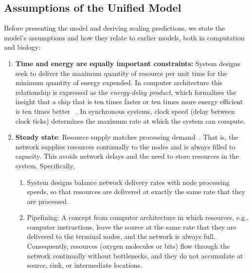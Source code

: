 \documentclass[12pt]{article}
\begin{document}
\subsection{Assumptions of the Unified Model}
\label{sec:assumptions}

Before presenting the model and deriving scaling predictions, we state the
model's assumptions and how they relate to earlier models, both in
computation and biology:

\begin{enumerate}
\item {\bf Time and energy are equally important constraints:} 
  System designs seek to deliver the maximum quantity of
  resource per unit time for the minimum quantity of energy expended. 
  In computer architecture this relationship is expressed as the
  \emph{energy-delay product}, which formalizes the insight that a
  chip that is ten times faster or ten times more energy efficient is
  ten times better ~\cite{horowitz1994low}.   In synchronous systems, clock speed (delay
  between clock ticks) determines the maximum rate at which the system can compute.

\item {\bf Steady state}: Resource supply matches processing
  demand~\cite{banavar2002supply, banavar10}.  That is, the network supplies resources continually
  to the nodes and is always filled to capacity.  This avoids network
  delays and the need to store resources in the system. Specifically,

  \begin{enumerate}

\item System designs balance network delivery rates with node processing
  speeds, so that resources are delivered at exactly the same rate that they
  are processed.

\item Pipelining: A concept from computer architecture in which resources,
  e.g., computer instructions, leave the source at the same rate that they are
  delivered to the terminal nodes, and the network is always full.  %
  Consequently, resources (oxygen molecules or bits) flow through the network continually 
  without bottlenecks, and they do not accumulate at source, sink, or intermediate locations.
  \end{enumerate}


\end{enumerate}
\end{document}
